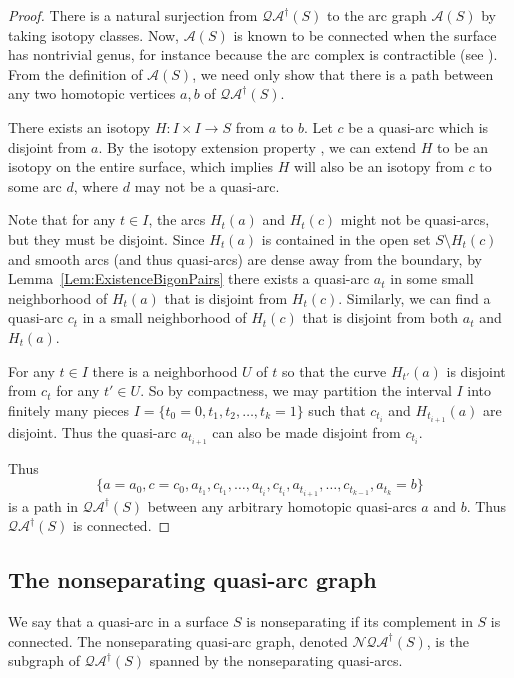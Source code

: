 \documentclass[12pt,a4paper]{amsart}
\theoremstyle{definition}
\theoremstyle{plain}
\numberwithin{equation}{section}
\newcommand{\qag}{\mathcal{QA}^{\dagger}}
\newcommand{\nqag}{\mathcal{N\!QA}^{\dagger}}
\begin{document}
\begin{proof}
    There is a natural surjection from $\qag(S)$ to the arc graph $\mathcal{A}(S)$ by taking isotopy classes.
    Now, $\mathcal{A}(S)$ is known to be connected when the surface has nontrivial genus, for instance because the arc complex is contractible (see \cite{hatcher1991arcgraph}).
    From the definition of $\mathcal{A}(S)$, we need only show that there is a path between any two homotopic vertices $a,b$ of $\qag(S)$.
    
    There exists an isotopy $H : I \times I \to S$ from $a$ to $b$.
    Let $c$ be a quasi-arc which is disjoint from $a$.
    By the isotopy extension property \cite[Corollary 1.4]{edwardsKirby1971deformations}, we can extend $H$ to be an isotopy on the entire surface, which implies $H$ will also be an isotopy from $c$ to some arc $d$, where $d$ may not be a quasi-arc.

    Note that for any $t\in I$, the arcs $H_{t}(a)$ and $H_{t}(c)$ might not be quasi-arcs, but they must be disjoint. Since $H_{t}(a)$ is contained in the open set $S\setminus H_{t}(c)$ and smooth arcs (and thus quasi-arcs) are dense away from the boundary, by Lemma~\ref{Lem:ExistenceBigonPairs} there exists a quasi-arc $a_t$ in some small neighborhood of $H_{t}(a)$ that is disjoint from $H_{t}(c)$. Similarly, we can find a quasi-arc $c_t$ in a small neighborhood of $H_{t}(c)$ that is disjoint from both $a_t$ and $H_{t}(a)$.

    For any $t \in I$ there is a neighborhood $U$ of $t$ so that the curve $H_{t'}(a)$ is disjoint from $c_t$ for any $t' \in U$.
    So by compactness, we may partition the interval $I$ into finitely many pieces $I = \{t_0 = 0, t_1, t_2, \ldots, t_k = 1\}$ such that $c_{t_i}$ and $H_{t_{i+1}}(a)$ are disjoint. Thus the quasi-arc $a_{t_{i+1}}$ can also be made disjoint from $c_{t_i}$. 

    Thus $$\{a=a_0, c=c_0, a_{t_1}, c_{t_1}, \ldots, a_{t_i}, c_{t_i}, a_{t_{i+1}}, \ldots, c_{t_{k-1}}, a_{t_k}=b\} $$ is a path in $\qag(S)$ between any arbitrary homotopic quasi-arcs $a$ and $b$. Thus $\qag(S)$ is connected.
\end{proof}

\subsection*{The nonseparating quasi-arc graph}
We say that a quasi-arc in a surface $S$ is nonseparating if its complement in $S$ is connected. The nonseparating quasi-arc graph, denoted $\nqag(S)$, is the subgraph of $\qag(S)$ spanned by the nonseparating quasi-arcs.
\end{document}
